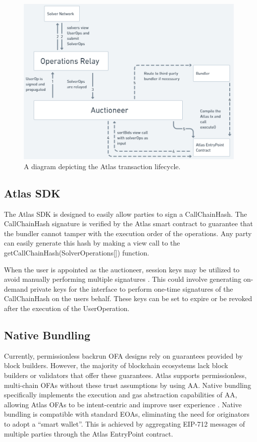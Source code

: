 \documentclass{article}
\begin{document}
\begin{itemize}
\begin{figure}
\centering
\includegraphics[width=.8\linewidth]{AtlasWP (5).png}
\caption{\label{fig:AtlasWP(5).png}A diagram depicting the Atlas transaction lifecycle.}
\end{figure}

\end{itemize}

\subsection{Atlas SDK}
The Atlas SDK is designed to easily allow parties to sign a CallChainHash. The CallChainHash signature is verified by the Atlas smart contract to guarantee that the bundler cannot tamper with the execution order of the operations. Any party can easily generate this hash by making a view call to the getCallChainHash(SolverOperations[]) function. 

When the user is appointed as the auctioneer, session keys may be utilized to avoid manually performing multiple signatures \cite{key}. This could involve generating on-demand private keys for the interface to perform one-time signatures of the CallChainHash on the users behalf. These keys can be set to expire or be revoked after the execution of the UserOperation. 

\subsection{Native Bundling}
Currently, permissionless backrun OFA designs rely on guarantees provided by block builders. However, the majority of blockchain ecosystems lack block builders or validators that offer these guarantees. Atlas supports permissionless, multi-chain OFAs without these trust assumptions by using AA. Native bundling specifically implements the execution and gas abstraction capabilities of AA, allowing Atlas OFAs to be intent-centric and improve user experience \cite{yoav}. Native bundling is compatible with standard EOAs, eliminating the need for originators to adopt a “smart wallet”. This is achieved by aggregating EIP-712 messages of multiple parties through the Atlas EntryPoint contract.
\end{document}
